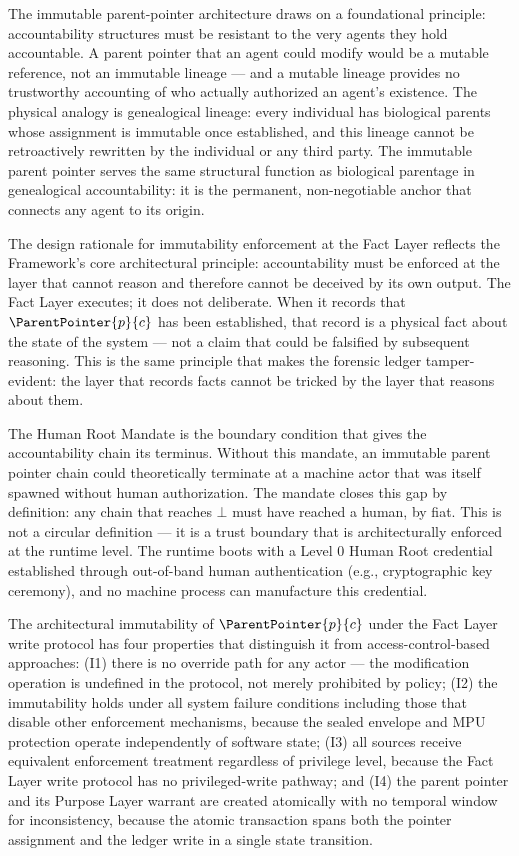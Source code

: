 The immutable parent-pointer architecture draws on a foundational principle: accountability structures must be resistant to the very agents they hold accountable. A parent pointer that an agent could modify would be a mutable reference, not an immutable lineage --- and a mutable lineage provides no trustworthy accounting of who actually authorized an agent's existence. The physical analogy is genealogical lineage: every individual has biological parents whose assignment is immutable once established, and this lineage cannot be retroactively rewritten by the individual or any third party. The immutable parent pointer serves the same structural function as biological parentage in genealogical accountability: it is the permanent, non-negotiable anchor that connects any agent to its origin.

The design rationale for immutability enforcement at the Fact Layer reflects the \bxthree{} Framework's core architectural principle: accountability must be enforced at the layer that cannot reason and therefore cannot be deceived by its own output. The Fact Layer executes; it does not deliberate. When it records that $\ParentPointer{p}{c}$ has been established, that record is a physical fact about the state of the system --- not a claim that could be falsified by subsequent reasoning. This is the same principle that makes the forensic ledger tamper-evident: the layer that records facts cannot be tricked by the layer that reasons about them.

The Human Root Mandate is the boundary condition that gives the accountability chain its terminus. Without this mandate, an immutable parent pointer chain could theoretically terminate at a machine actor that was itself spawned without human authorization. The mandate closes this gap by definition: any chain that reaches $\bot$ must have reached a human, by fiat. This is not a circular definition --- it is a trust boundary that is architecturally enforced at the runtime level. The runtime boots with a Level 0 Human Root credential established through out-of-band human authentication (e.g., cryptographic key ceremony), and no machine process can manufacture this credential.

The architectural immutability of $\ParentPointer{p}{c}$ under the Fact Layer write protocol has four properties that distinguish it from access-control-based approaches: (I1) there is no override path for any actor --- the modification operation is undefined in the protocol, not merely prohibited by policy; (I2) the immutability holds under all system failure conditions including those that disable other enforcement mechanisms, because the sealed envelope and MPU protection operate independently of software state; (I3) all sources receive equivalent enforcement treatment regardless of privilege level, because the Fact Layer write protocol has no privileged-write pathway; and (I4) the parent pointer and its Purpose Layer warrant are created atomically with no temporal window for inconsistency, because the atomic transaction spans both the pointer assignment and the ledger write in a single state transition.

